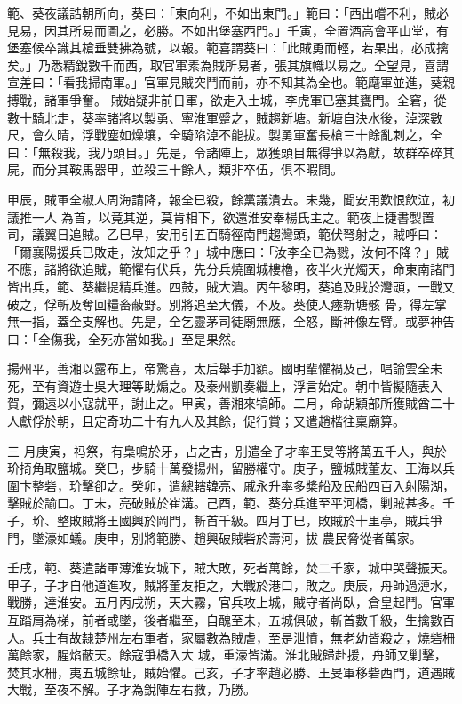 \begin{pinyinscope}
 範、葵夜議誥朝所向，葵曰：「東向利，不如出東門。」範曰：「西出嚐不利，賊必見易，因其所易而圖之，必勝。不如出堡塞西門。」壬寅，全置酒高會平山堂，有堡塞候卒識其槍垂雙拂為號，以報。範喜謂葵曰：「此賊勇而輕，若果出，必成擒矣。」乃悉精銳數千而西，取官軍素為賊所易者，張其旗幟以易之。全望見，喜謂宣差曰：「看我掃南軍。」官軍見賊突鬥而前，亦不知其為全也。範麾軍並進，葵親搏戰，諸軍爭奮。
 賊始疑非前日軍，欲走入土城，李虎軍已塞其甕門。全窘，從數十騎北走，葵率諸將以製勇、寧淮軍蹙之，賊趨新塘。新塘自決水後，淖深數尺，會久晴，浮戰塵如燥壤，全騎陷淖不能拔。製勇軍奮長槍三十餘亂刺之，全曰：「無殺我，我乃頭目。」先是，令諸陣上，眾獲頭目無得爭以為獻，故群卒碎其屍，而分其鞍馬器甲，並殺三十餘人，類非卒伍，俱不暇問。



 甲辰，賊軍全椒人周海請降，報全已殺，餘黨議潰去。未幾，聞安用歎恨飲泣，初議推一人
 為首，以竟其逆，莫肯相下，欲還淮安奉楊氏主之。範夜上捷書製置司，議翼日追賊。乙巳早，安用引五百騎徑南門趨灣頭，範伏弩射之，賊呼曰：「爾襄陽援兵已敗走，汝知之乎？」城中應曰：「汝李全已為戮，汝何不降？」賊不應，諸將欲追賊，範懼有伏兵，先分兵燒圍城樓櫓，夜半火光燭天，命東南諸門皆出兵，範、葵繼提精兵進。四鼓，賊大潰。丙午黎明，葵追及賊於灣頭，一戰又破之，俘斬及奪回糧畜蔽野。別將追至大儀，不及。葵使人瘞新塘骸
 骨，得左掌無一指，蓋全支解也。先是，全乞靈茅司徒廟無應，全怒，斷神像左臂。或夢神告曰：「全傷我，全死亦當如我。」至是果然。



 揚州平，善湘以露布上，帝驚喜，太后舉手加額。國明輩懼禍及己，唱論雲全未死，至有資遊士吳大理等助煽之。及泰州凱奏繼上，浮言始定。朝中皆擬隨表入賀，彌遠以小寇就平，謝止之。甲寅，善湘來犒師。二月，命胡穎部所獲賊酋二十人獻俘於朝，且定奇功二十有九人及其餘，促行賞；又遣趙楷往稟廟算。



 三
 月庚寅，祃祭，有梟鳴於牙，占之吉，別遣全子才率王旻等將萬五千人，與於玠掎角取鹽城。癸巳，步騎十萬發揚州，留勝權守。庚子，鹽城賊董友、王海以兵圍卞整砦，玠擊卻之。癸卯，遣總轄韓亮、戚永升率多槳船及民船四百入射陽湖，擊賊於諭口。丁未，亮破賊於崔溝。己酉，範、葵分兵進至平河橋，剿賊甚多。壬子，玠、整敗賊將王國興於岡門，斬首千級。四月丁巳，敗賊於十里亭，賊兵爭門，墜濠如蟻。庚申，別將範勝、趙興破賊砦於壽河，拔
 農民脅從者萬家。



 壬戌，範、葵遣諸軍薄淮安城下，賊大敗，死者萬餘，焚二千家，城中哭聲振天。甲子，子才自他道進攻，賊將董友拒之，大戰於港口，敗之。庚辰，舟師過漣水，戰勝，達淮安。五月丙戌朔，天大霧，官兵攻上城，賊守者尚臥，倉皇起鬥。官軍互踏肩為梯，前者或墜，後者繼至，自醜至未，五城俱破，斬首數千級，生擒數百人。兵士有故隸楚州左右軍者，家屬數為賊虐，至是泄憤，無老幼皆殺之，燒砦柵萬餘家，腥焰蔽天。餘寇爭橋入大
 城，重濠皆滿。淮北賊歸赴援，舟師又剿擊，焚其水柵，夷五城餘址，賊始懼。己亥，子才率趙必勝、王旻軍移砦西門，道遇賊大戰，至夜不解。子才為銳陣左右救，乃勝。




\end{pinyinscope}
